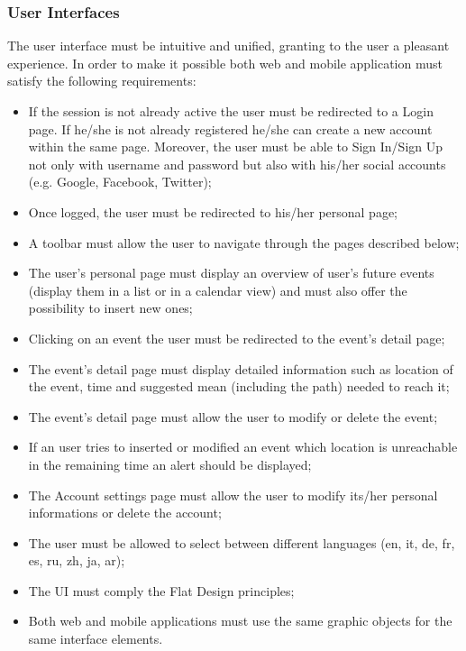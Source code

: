 \documentclass{article}
\begin{document}
	\subsubsection{User Interfaces}
	The user interface must be intuitive and unified, granting to the user a pleasant experience. In order to make it possible both web and mobile application must satisfy the following requirements:
	\begin{itemize}
		\item If the session is not already active the user must be redirected to a Login page. If he/she is not already registered he/she can create a new account within the same page. Moreover, the user must be able to Sign In/Sign Up not only with username and password but also with his/her social accounts (e.g. Google, Facebook, Twitter);
		\item Once logged, the user must be redirected to his/her personal page;
		\item A toolbar must allow the user to navigate through the pages described below;
		\item The user's personal page must display an overview of user's future events (display them in a list or in a calendar view) and must also offer the possibility to insert new ones;
		\item Clicking on an event the user must be redirected to the event's detail page;
		\item The event's detail page must display detailed information such as location of the event, time and suggested mean (including the path)  needed to reach it;
		\item The event's detail page must allow the user to modify or delete the event;
		\item If an user tries to inserted or modified an event which location is unreachable in the remaining time an alert should be displayed;
		\item The Account settings page must allow the user to modify its/her personal informations or delete the account;
		\item The user must be allowed to select between different languages (en, it, de, fr, es, ru, zh, ja, ar);
		\item The UI must comply the Flat Design principles;
		\item Both web and mobile applications must use the same graphic objects for the same interface elements.
	\end{itemize}
	
\end{document}
